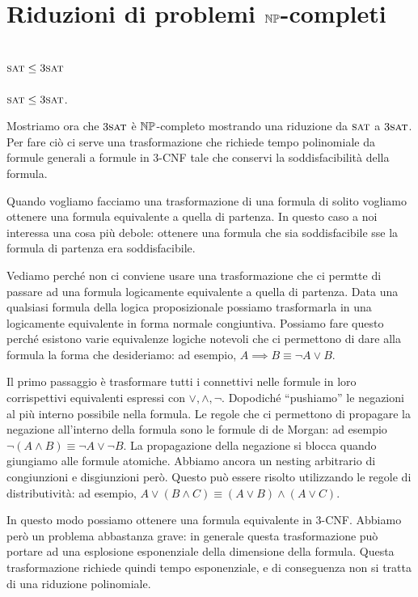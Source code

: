 \section{Riduzioni di problemi $\mathbb{NP}$-completi}

\subsection{$\textsc{sat} \leq 3\textsc{sat}$}


\begin{thm}
        $\textsc{sat} \leq 3\textsc{sat}$.
\end{thm}

Mostriamo ora che $3\textsc{sat}$ è $\mathbb{NP}$-completo mostrando una riduzione da $\textsc{sat}$ a $3\textsc{sat}$. Per
fare ciò ci serve una trasformazione che richiede tempo polinomiale da formule generali a formule
in 3-CNF tale che conservi la soddisfacibilità della formula.

Quando vogliamo facciamo una trasformazione di una formula di solito vogliamo ottenere una formula
equivalente a quella di partenza. In questo caso a noi interessa una cosa più debole: ottenere una
formula che sia soddisfacibile sse la formula di partenza era soddisfacibile.

Vediamo perché non ci conviene usare una trasformazione che ci permtte di passare ad una formula
logicamente equivalente a quella di partenza. Data una qualsiasi formula della logica proposizionale
possiamo trasformarla in una logicamente equivalente in forma normale congiuntiva. Possiamo fare
questo perché esistono varie equivalenze logiche notevoli che ci permettono di dare alla formula la
forma che desideriamo: ad esempio, $A \implies B \equiv \lnot A \lor B$.

Il primo passaggio è trasformare tutti i connettivi nelle formule in loro corrispettivi equivalenti
espressi con $\lor,\land,\lnot$. Dopodiché ``pushiamo'' le negazioni al più interno possibile nella
formula. Le regole che ci permettono di propagare la negazione all'interno della formula sono le
formule di de Morgan: ad esempio $\lnot (A \land B) \equiv \lnot A \lor \lnot B$. La propagazione
della negazione si blocca quando giungiamo alle formule atomiche. Abbiamo ancora un nesting
arbitrario di congiunzioni e disgiunzioni però. Questo può essere risolto utilizzando le regole di
distributività: ad esempio, $A \lor (B \land C) \equiv (A \lor B) \land (A \lor C)$.

In questo modo possiamo ottenere una formula equivalente in 3-CNF. Abbiamo però un problema
abbastanza grave: in generale questa trasformazione può portare ad una esplosione esponenziale
della dimensione della formula. Questa trasformazione richiede quindi tempo esponenziale, e di
conseguenza non si tratta di una riduzione polinomiale.

